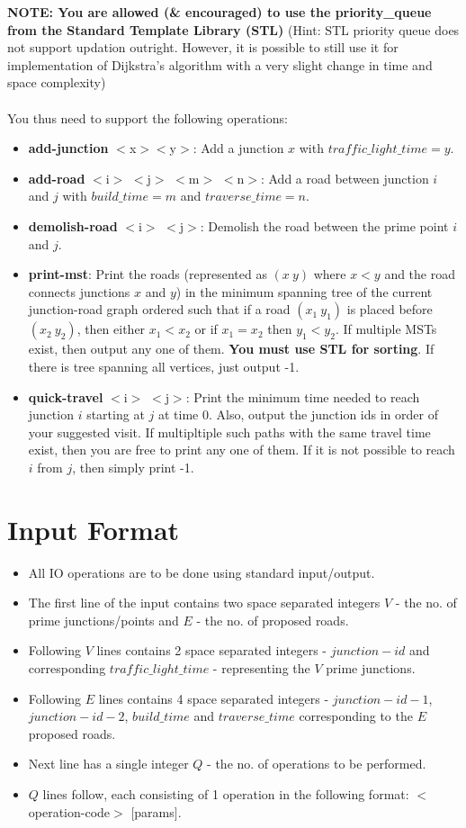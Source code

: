\documentclass[20pt]{article}
\begin{document}
\textbf{NOTE: You are allowed (\& encouraged) to use the priority\_queue from the Standard Template Library (STL)} (Hint: STL priority queue does not support updation outright. However, it is possible to still use it for implementation of Dijkstra's algorithm with a very slight change in time and space complexity)
\\\\
You thus need to support the following operations:
\begin{itemize}

\item \textbf{add-junction} $<$x$>$$<$y$>$: Add a junction $x$ with $traffic\_light\_time = y$.
\item \textbf{add-road} $<$i$>$ $<$j$>$ $<$m$>$ $<$n$>$: Add a road between junction $i$ and $j$ with $build\_time = m$ and $traverse\_time = n$.
\item \textbf{demolish-road} $<$i$>$ $<$j$>$: Demolish the road between the prime point $i$ and $j$. 
\item \textbf{print-mst}: Print the roads (represented as $(x \ y)$ where $x<y$ and the road connects junctions $x$ and $y$) in the minimum spanning tree of the current junction-road graph ordered such that if a road $(x_1 \ y_1)$ is placed before $(x_2 \ y_2)$, then either $x_1 < x_2$ or if $x_1 = x_2$ then $y_1 < y_2$. If multiple MSTs exist, then output any one of them. \textbf{You must use STL for sorting}. If there is tree spanning all vertices, just output -1.
\item \textbf{quick-travel} $<$i$>$ $<$j$>$: Print the minimum time needed to reach junction $i$ starting at $j$ at time 0. Also, output the junction ids in order of your suggested visit. If multipltiple such paths with the same travel time exist, then you are free to print any one of them. If it is not possible to reach $i$ from $j$, then simply print -1.
\end{itemize}


\section{Input Format}
\begin{itemize}
\item All IO operations are to be done using standard input/output.
\item The first line of the input contains two space separated integers $V$ - the no. of prime junctions/points and $E$ - the no. of proposed roads.
\item Following $V$ lines contains 2 space separated integers - $junction-id$ and corresponding $traffic\_light\_time$ - representing the $V$ prime junctions.
\item Following $E$ lines contains 4 space separated integers - $junction-id-1$, $junction-id-2$, $build\_time$  and $traverse\_time$  corresponding to the $E$ proposed roads.
\item Next line has a single integer $Q$ - the no. of operations to be performed.
\item $Q$ lines follow, each consisting of 1 operation in the following format: $<$operation-code$>$ $[$params$]$.
\end{itemize}
\end{document}
